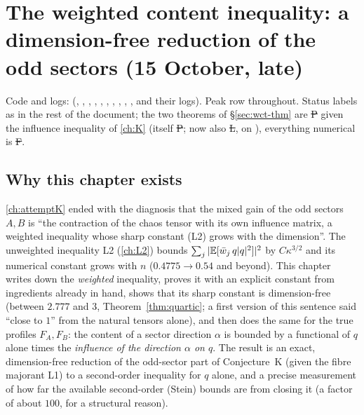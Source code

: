 \section{The weighted content inequality: a dimension-free reduction of the odd sectors (15 October, late)}\label{ch:weighted}

Code and logs:  (, , , , , , , , , ,  and their logs).
Peak row throughout. Status labels as in the rest of the document; the two theorems of \S\ref{sec:wct-thm} are \st{P} given the influence inequality of \autoref{ch:K} (itself \st{P}; now also \st{L},  on ),
everything numerical is \st{F}.

\subsection{Why this chapter exists}
\autoref{ch:attemptK} ended with the diagnosis that the mixed gain of the odd sectors $A,B$ is ``the contraction of the chaos tensor with its own influence matrix, a weighted
inequality whose sharp constant (L2) grows with the dimension''. The unweighted inequality L2 (\autoref{ch:L2}) bounds $\sum_j|\mathbb E[\bar w_j\,q|q|^2]|^2$ by $C\kappa^{3/2}$ and its
numerical constant grows with $n$ ($0.4775\to0.54$ and beyond). This chapter writes down the \emph{weighted} inequality, proves it with an explicit constant from ingredients already
in hand, shows that its sharp constant is dimension-free (between $2.777$ and $3$, Theorem~\ref{thm:quartic}; a first version of this sentence said ``close to $1$'' from the natural tensors alone), and then does the same for the true profiles $F_A,F_B$: the content of a sector direction $\alpha$ is bounded by a
functional of $q$ alone times the \emph{influence of the direction $\alpha$ on $q$}. The result is an exact, dimension-free reduction of the odd-sector part of Conjecture~K (given the fibre
majorant L1) to a second-order inequality for $q$ alone, and a precise measurement of how far the available second-order (Stein) bounds are from closing it (a factor of about $100$, for a structural reason).

